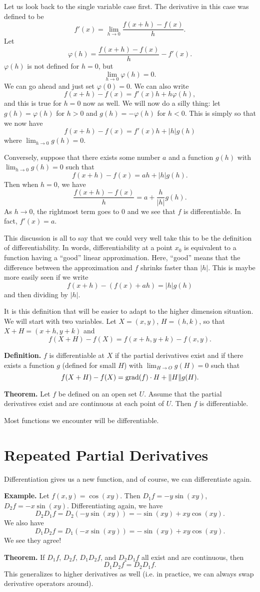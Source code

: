 \documentclass{article}
\DeclareMathOperator{\grd}{grad}
\begin{document}
Let us look back to the single variable case first. The derivative
in this case was defined to be
\[f'(x) = \lim_{h \to 0} \frac{f(x+h) - f(x)}{h}.\]
Let 
\[\varphi(h) = \frac{f(x+h) - f(x)}{h} - f'(x).\]
$\varphi(h)$ is not defined for $h=0$, but 
\[\lim_{h \to 0} \varphi(h) = 0.\]
We can go ahead and just set $\varphi(0)=0$.
We can also write 
\[f(x+h) - f(x) = f'(x)h + h\varphi(h),\]
and this is true for $h=0$ now as well. We will now do a silly thing:
let $g(h) = \varphi(h)$ for $h>0$ and $g(h) = -\varphi(h)$ for $h<0$. This is simply
so that we now have
\[f(x+h) - f(x) = f'(x)h + |h|g(h)\]
where $\lim_{h\to 0} g(h)=0$.

Conversely, suppose that there exists some number $a$ 
and a function $g(h)$ 
with $\lim_{h \to 0} g(h) = 0$ such that
\[f(x+h) - f(x) = ah + |h|g(h).\]
Then when $h=0$, we have
\[\frac{f(x+h)-f(x)}{h} = a + \frac{h}{|h|} g(h).\]
As $h \to 0$, the rightmost term goes to $0$ and we see that $f$
is differentiable. In fact, $f'(x) = a$.


This discussion is all to say that we could very well take this
to be the definition of differentiability. In words, differentiability
at a point $x_0$ is equivalent to a function having a ``good'' linear approximation.
Here, ``good'' means that the difference between the approximation and $f$
shrinks faster than $|h|$. This is maybe more easily seen if we write
\[f(x+h) - \left( f(x) + ah \right) = |h|g(h)\]
and then dividing by $|h|$.

It is this definition that will be easier to adapt to the higher dimension 
situation. We will start with two variables. Let $X=(x,y)$, $H=(h,k)$,
so that $X+H=(x+h,y+k)$ and 
\[f(X+H)-f(X) = f(x+h,y+k) - f(x,y).\]

\textbf{Definition.} $f$ is differentiable at $X$ if the partial derivatives 
exist and if there exists a function $g$ (defined for small $H$) 
with $\lim_{H \to O} g(H) = 0$ such that
\[f(X+H) - f(X) = \grd(f)\cdot H + \norm{H}g(H).\]

\textbf{Theorem.} Let $f$ be defined on an open set $U$. Assume that
the partial derivatives exist and are continuous at each point of $U$.
Then $f$ is differentiable.

Most functions we encounter will be differentiable.

\section*{Repeated Partial Derivatives}

Differentiation gives us a new function, and of course, we 
can differentiate again.

\textbf{Example.} Let $f(x,y) = \cos(xy)$. 
Then $D_1 f = -y\sin(xy)$, $D_2 f = -x\sin(xy)$.
Differentiating again, we have
\[D_2 D_1 f = D_2 (-y\sin(xy)) = -\sin(xy) + xy \cos(xy).\]
We also have
\[D_1 D_2 f = D_1 (-x\sin(xy)) = -\sin(xy) + xy\cos(xy).\]
We see they agree!

\textbf{Theorem.} If $D_1f$, $D_2 f$, $D_1 D_2 f$, and $D_2 D_1 f$
all exist and are continuous, then 
\[D_1 D_2 f = D_2 D_1 f.\]
This generalizes to higher derivatives as well (i.e. in practice, 
we can always swap derivative operators around).
\end{document}
